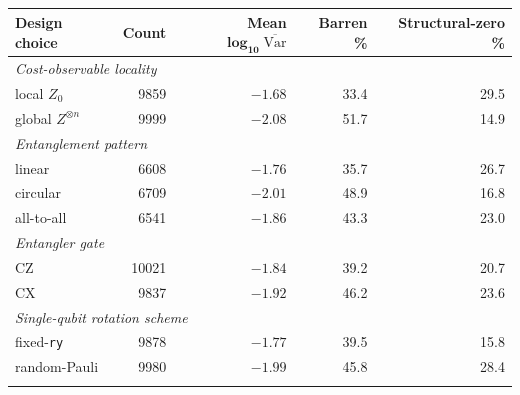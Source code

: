 \begin{tabular}{lrrrr}
\toprule
\textbf{Design choice} & \textbf{Count} & \textbf{Mean} $\boldsymbol{\log_{10}\overline{\mathrm{Var}}}$ & \textbf{Barren \%} & \textbf{Structural-zero \%}\\
\midrule
\multicolumn{5}{l}{\emph{Cost-observable locality}}\\
\quad local $Z_0$ & 9859 & $-1.68$ & 33.4 & 29.5\\
\quad global $Z^{\otimes n}$ & 9999 & $-2.08$ & 51.7 & 14.9\\
\midrule
\multicolumn{5}{l}{\emph{Entanglement pattern}}\\
\quad linear & 6608 & $-1.76$ & 35.7 & 26.7\\
\quad circular & 6709 & $-2.01$ & 48.9 & 16.8\\
\quad all-to-all & 6541 & $-1.86$ & 43.3 & 23.0\\
\midrule
\multicolumn{5}{l}{\emph{Entangler gate}}\\
\quad CZ & 10021 & $-1.84$ & 39.2 & 20.7\\
\quad CX & 9837 & $-1.92$ & 46.2 & 23.6\\
\midrule
\multicolumn{5}{l}{\emph{Single-qubit rotation scheme}}\\
\quad fixed-\texttt{ry} & 9878 & $-1.77$ & 39.5 & 15.8\\
\quad random-Pauli & 9980 & $-1.99$ & 45.8 & 28.4\\
\botrule
\end{tabular}
